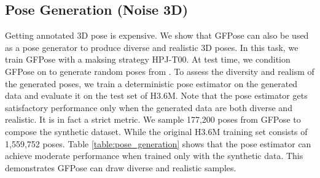 \documentclass[10pt,twocolumn,letterpaper]{article}
\begin{document}
\begin{table}
    \vspace{-0.2cm}
    \caption{Denoising results on H3.6M dataset. We report MPJPE (mm) under Protocol \#2.  and  denote Gaussian and uniform noise respectively.  denotes the start time of RSDE.}
    \label{table:mocap_denoise}
    \vspace{-0.5cm}
\end{table}



\subsection{Pose Generation (Noise  3D)}
Getting annotated 3D pose is expensive. We show that GFPose can also be used as a pose generator to produce diverse and realistic 3D poses. 
In this task, we train GFPose with a maksing strategy HPJ-T00. At test time, we condition GFPose on  to generate random poses from .
To assess the diversity and realism of the generated poses, we train a deterministic pose estimator on the generated data and evaluate it on the test set of H3.6M. Note that the pose estimator gets satisfactory performance only when the generated data are both diverse and realistic. It is in fact a strict metric. We sample 177,200 poses from GFPose to compose the synthetic dataset. While the original H3.6M training set consists of 1,559,752 poses. 
Table \ref{table:pose_generation} shows that the pose estimator can achieve moderate performance when trained only with the synthetic data. This demonstrates GFPose can draw diverse and realistic samples. 
\end{document}
